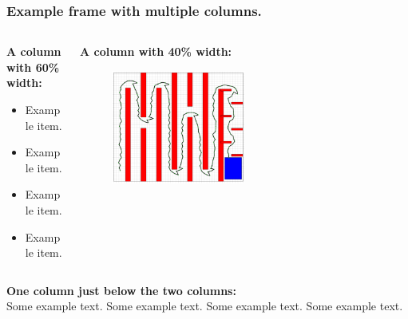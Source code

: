 \documentclass{hyconsys-presentation}
\begin{document}
	\begin{frame} \frametitle{Example frame with multiple columns.}
		\begin{columns}
			\begin{column}{0.6\textwidth}				
				\textbf{A column with 60\% width:}
				\begin{itemize}			
					\item Example item.
					\item Example item.
					\item Example item.
					\item Example item.
				\end{itemize}				
			\end{column}
			\begin{column}{0.4\textwidth}
				\textbf{A column with 40\% width:}
				\begin{figure}
					\centering
					\includegraphics[width=0.50\textwidth]{figures/car_maze.png}
				\end{figure}		    
			\end{column}
		\end{columns}
		
		
		\hspace{-1.2em}
		\textbf{One column just below the two columns:}\\
		\vspace{0.5em}
		Some example text. Some example text. Some example text. Some example text. 
		
	\end{frame}
\end{document}
